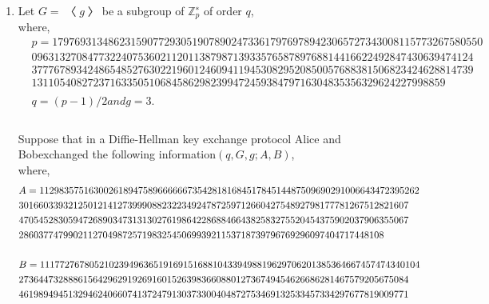 \documentclass{article}
\theoremstyle{break}
\begin{document}
\begin{enumerate}
\begin{proof}
                Because $a^{o(a)} = 1$, we have $a^r = 1$ and $r = 0$\\
                so, $o(a) \mid m$
        \end{proof}
        \newpage
        \item Let $G=〈g〉$be a subgroup of $\mathbb{Z}^∗_p$ of order $q$, \\where,\\
        \[
        \begin{aligned}
                &p=17976931348623159077293051907890247336179769789423065727343008115773267580550\\
                &0963132708477322407536021120113879871393357658789768814416622492847430639474124\\
                &3777678934248654852763022196012460941194530829520850057688381506823424628814739\\
                &13110540827237163350510684586298239947245938479716304835356329624227998859\\
                & \\
                &q= (p−1)/2 and g= 3.\\            
        \end{aligned}
        \]
        \\Suppose that in a Diffie-Hellman key exchange protocol Alice and Bobexchanged the following information$ (q, G, g;A, B)$,\\
        where,\\  
        \[      
        \begin{aligned}
                &A=11298357516300261894758966666673542818168451784514487509690291006643472395262\\
                &3016603393212501214127399908823223492478725971266042754892798177781267512821607\\
                &4705452830594726890347313130276198642286884664382583275520454375902037906355067\\
                &28603774799021127049872571983254506993921153718739796769296097404717448108\\
                \leavevmode\\
                &B=11177276780521023949636519169151688104339498819629706201385364667457474340104\\
                &2736447328886156429629192691601526398366088012736749454626686281467579205675084\\
                &4619894945132946240660741372479130373300404872753469132533457334297677819009771\\

\end{aligned}\]
\end{enumerate}
\end{document}
